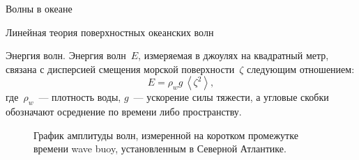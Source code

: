 \begin{chapter}{Волны в океане}
\begin{section}{Линейная теория поверхностных океанских волн}
\begin{paragraph}{Энергия волн.}
Энергия волн~$E$, измеряемая в джоулях на квадратный
метр, связана с дисперсией%
смещения морской поверхности~$\zeta$ следующим
отношением:
 \begin{equation}\label{eq:16.12}
 E = \rho _{w} g \, \left< \zeta ^{2} \right>,
 \end{equation}
где~$\rho _{w}$~--- плотность воды, $g$~--- ускорение силы тяжести, 
а угловые скобки обозначают осреднение по времени либо пространству.
%
\end{paragraph}

\begin{figure}[h!]
\vspace{1ex}
\begin{center}
\end{center}
\caption{График амплитуды волн, измеренной на коротком промежутке времени
wave buoy, установленным в Северной Атлантике.}
\label{fig:waveheight}
\end{figure}
%
%


\end{section}
\end{chapter}

